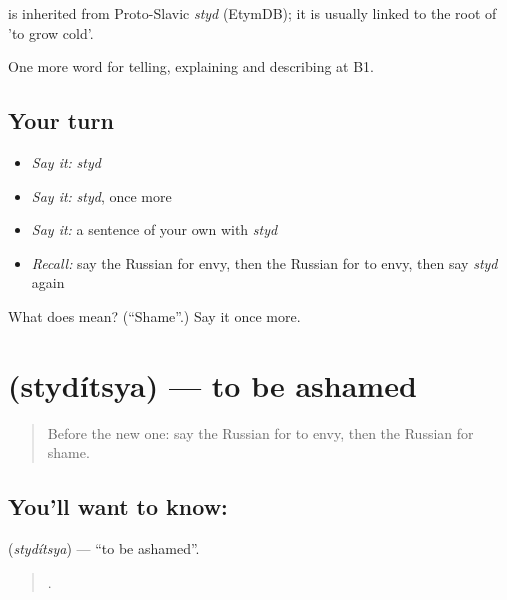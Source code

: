 \begin{cousinweb}
\emph{} is inherited from Proto-Slavic \emph{styd} (EtymDB); it is usually linked to the root of \emph{} 'to grow cold'.
\end{cousinweb}

\begin{grammarlens}[title={What you've built}]
One more word for telling, explaining and describing at B1.
\end{grammarlens}

\subsection*{Your turn}
\begin{itemize}
\raggedright
  \item \emph{Say it:} \emph{styd}
  \item \emph{Say it:} \emph{styd}, once more
  \item \emph{Say it:} a sentence of your own with \emph{styd}
  \item \emph{Recall:} say the Russian for envy, then the Russian for to envy, then say \emph{styd} again
\end{itemize}

\begin{tcolorbox}[breakable,colback=teal!4,colframe=teal!35!black,title={Before you move on}]
What does  mean? (\textquotedblleft{}Shame\textquotedblright{}.) Say it once more.
\end{tcolorbox}
\section[\texorpdfstring{\ru{стыдиться} (stydítsya)}{стыдиться (stydítsya)}]{ (stydítsya) — to be ashamed}

\label{lesson:RU-C470-styditsya}



\begin{quote}
Before the new one: say the Russian for to envy, then the Russian for shame.
\end{quote}

\subsection*{You'll want to know: }
\textbf{} (\emph{stydítsya}) — \textquotedblleft{}to be ashamed\textquotedblright{}.

\begin{quote}
   .
\end{quote}

